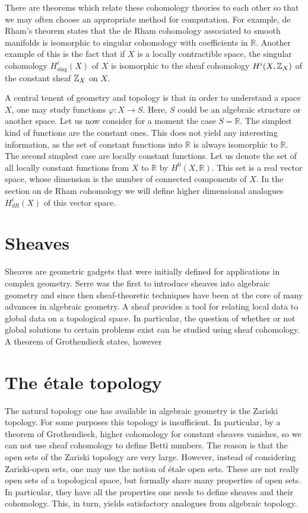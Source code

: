 There are theorems which relate these cohomology theories to each other so that we may often choose an appropriate method for computation. For example, de Rham's theorem states that the de Rham cohomology associated to smooth manifolds is isomorphic to singular cohomology with coefficients in $\mathbb{R}$. Another example of this is the fact that if $X$ is a locally contractible space, the singular cohomology $H_{\text{sing}}^i(X)$ of $X$ is isomorphic to the sheaf cohomology $H^i(X, \mathbb{Z}_X)$ of the constant sheaf $\mathbb{Z}_X$ on $X$.

A central tenent of geometry and topology is that in order to understand a space $X$, one may study functions $\varphi: X \to S$. Here, $S$ could be an algebraic structure or another space. Let us now consider for a moment the case $S=\mathbb{R}$. The simplest kind of functions are the constant ones. This does not yield any interesting information, as the set of constant functions into $\mathbb{R}$ is always isomorphic to $\mathbb{R}$. The second simplest case are locally constant functions. Let us denote the set of all locally constant functions from $X$ to $\mathbb{R}$ by $H^0(X,\mathbb{R})$. This set is a real vector space, whose dimension is the number of connected components of $X$. In the section on de Rham cohomology we will define higher dimensional analogues $H^i_{dR}(X)$ of this vector space.

\section{Sheaves}
Sheaves are geometric gadgets that were initially defined for applications in complex geometry. Serre was the first to introduce sheaves into algebraic geometry and since then sheaf-theoretic techniques have been at the core of many advances in algebraic geometry.  A sheaf provides a tool for relating local data to global data on a topological space. In particular, the question of whether or not global solutions to certain problems exist can be studied using sheaf cohomology. A theorem of Grothendieck states, however

\section{The \'etale topology}
The natural topology one has available in algebraic geometry is the Zariski topology. For some purposes this topology is insufficient. In particular, by a theorem of Grothendieck, higher cohomology for constant sheaves vanishes, so we can not use sheaf cohomology to define Betti numbers. The reason is that the open sets of the Zariski topology are very large. However, instead of considering Zariski-open sets, one may use the notion of \'etale open sets. These are not really open sets of a topological space, but formally share many properties of open sets. In particular, they have all the properties one needs to define sheaves and their cohomology. This, in turn, yields satisfactory analogues from algebraic topology. 

